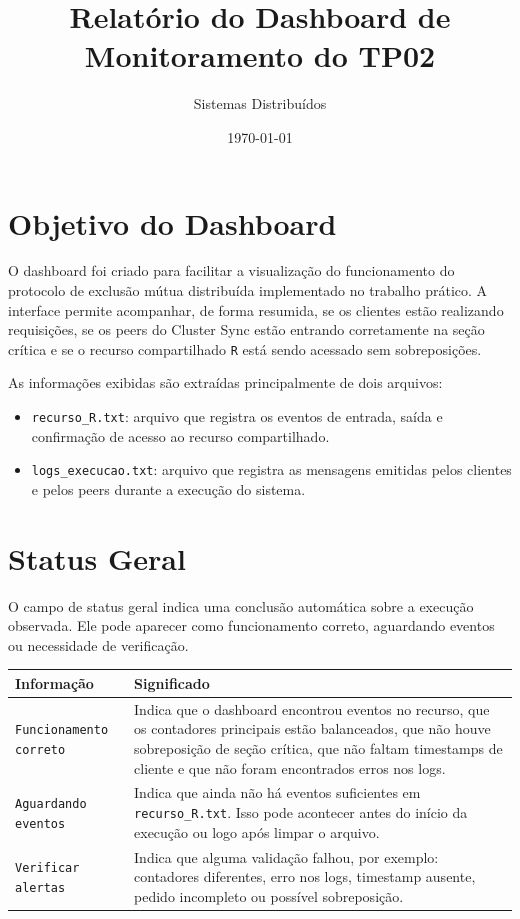 \documentclass[12pt,a4paper]{article}
\title{Relat\'orio do Dashboard de Monitoramento do TP02}
\author{Sistemas Distribu\'idos}
\date{\today}
\begin{document}
\maketitle

\section{Objetivo do Dashboard}

O dashboard foi criado para facilitar a visualiza\c{c}\~ao do funcionamento do protocolo
de exclus\~ao m\'utua distribu\'ida implementado no trabalho pr\'atico. A interface permite
acompanhar, de forma resumida, se os clientes est\~ao realizando requisi\c{c}\~oes, se os
peers do Cluster Sync est\~ao entrando corretamente na se\c{c}\~ao cr\'itica e se o recurso
compartilhado \texttt{R} est\'a sendo acessado sem sobreposi\c{c}\~oes.

As informa\c{c}\~oes exibidas s\~ao extra\'idas principalmente de dois arquivos:

\begin{itemize}
    \item \texttt{recurso\_R.txt}: arquivo que registra os eventos de entrada, sa\'ida e
    confirma\c{c}\~ao de acesso ao recurso compartilhado.
    \item \texttt{logs\_execucao.txt}: arquivo que registra as mensagens emitidas pelos
    clientes e pelos peers durante a execu\c{c}\~ao do sistema.
\end{itemize}

\section{Status Geral}

O campo de status geral indica uma conclus\~ao autom\'atica sobre a execu\c{c}\~ao observada.
Ele pode aparecer como funcionamento correto, aguardando eventos ou necessidade de
verifica\c{c}\~ao.

\begin{longtable}{>{\raggedright\arraybackslash}p{4cm} >{\raggedright\arraybackslash}p{10cm}}
\toprule
\textbf{Informa\c{c}\~ao} & \textbf{Significado} \\
\midrule
\texttt{Funcionamento correto} &
Indica que o dashboard encontrou eventos no recurso, que os contadores principais est\~ao
balanceados, que n\~ao houve sobreposi\c{c}\~ao de se\c{c}\~ao cr\'itica, que n\~ao faltam
timestamps de cliente e que n\~ao foram encontrados erros nos logs. \\
\texttt{Aguardando eventos} &
Indica que ainda n\~ao h\'a eventos suficientes em \texttt{recurso\_R.txt}. Isso pode
acontecer antes do in\'icio da execu\c{c}\~ao ou logo ap\'os limpar o arquivo. \\
\texttt{Verificar alertas} &
Indica que alguma valida\c{c}\~ao falhou, por exemplo: contadores diferentes, erro nos logs,
timestamp ausente, pedido incompleto ou poss\'ivel sobreposi\c{c}\~ao. \\
\bottomrule
\end{longtable}
\end{document}
